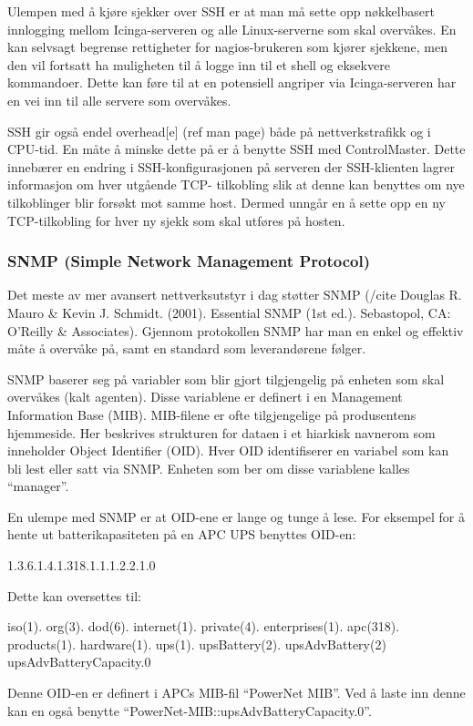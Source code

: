 Ulempen med å kjøre sjekker over SSH er at man må sette opp nøkkelbasert innlogging mellom Icinga-serveren og alle Linux-serverne som skal overvåkes. En kan selvsagt begrense rettigheter for nagios-brukeren som kjører sjekkene, men den vil fortsatt ha muligheten til å logge inn til et shell og eksekvere kommandoer. Dette kan føre til at en potensiell angriper via Icinga-serveren har en vei inn til alle servere som overvåkes.

SSH gir også endel overhead[e] (ref man page) både på nettverkstrafikk og i CPU-tid. En måte å minske dette på er å benytte SSH med ControlMaster. Dette innebærer en endring i SSH-konfigurasjonen på serveren der SSH-klienten lagrer informasjon om hver utgående TCP- tilkobling slik at denne kan benyttes om nye tilkoblinger blir forsøkt mot samme host. Dermed unngår en å sette opp en ny TCP-tilkobling for hver ny sjekk som skal utføres på hosten.  

\subsubsection{SNMP (Simple Network Management Protocol)}

Det meste av mer avansert nettverksutstyr i dag støtter SNMP (/cite Douglas R. Mauro \& Kevin J. Schmidt. (2001). Essential SNMP (1st ed.). Sebastopol, CA: O’Reilly \& Associates). Gjennom protokollen SNMP har man en enkel og effektiv måte å overvåke på, samt en standard som leverandørene følger. 

SNMP baserer seg på variabler som blir gjort tilgjengelig på enheten som skal overvåkes (kalt agenten). Disse variablene er definert i en Management Information Base (MIB). MIB-filene er ofte tilgjengelige på produsentens hjemmeside. Her beskrives strukturen for dataen i et hiarkisk navnerom som inneholder Object Identifier (OID). Hver OID identifiserer en variabel som kan bli lest eller satt via SNMP. Enheten som ber om disse variablene kalles “manager”. 

En ulempe med SNMP er at OID-ene er lange og tunge å lese. For eksempel for å hente ut batterikapasiteten på en APC UPS benyttes OID-en:

1.3.6.1.4.1.318.1.1.1.2.2.1.0

Dette kan oversettes til:

iso(1). org(3). dod(6). internet(1). private(4). enterprises(1). apc(318). products(1). hardware(1). ups(1). upsBattery(2). upsAdvBattery(2) upsAdvBatteryCapacity.0

Denne OID-en er definert i APCs MIB-fil “PowerNet MIB”. Ved å laste inn denne kan en også benytte “PowerNet-MIB::upsAdvBatteryCapacity.0”.

